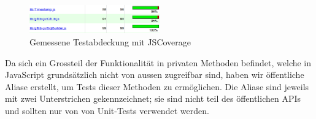 \begin{figure}[!ht]
	\centering
	\includegraphics[width=0.5\textwidth]{images/gftlib-js/gftlibjs-testabdeckung}
	\caption{Gemessene Testabdeckung mit JSCoverage}
	\label{gftlibjs-testabdeckung}
\end{figure}

Da sich ein Grossteil der Funktionalität in privaten Methoden befindet, welche in JavaScript grundsätzlich nicht von aussen zugreifbar sind, haben wir öffentliche Aliase erstellt, um Tests dieser Methoden zu ermöglichen. Die Aliase sind jeweils mit zwei Unterstrichen gekennzeichnet; sie sind nicht teil des öffentlichen \gls{API}s und sollten nur von von Unit-Tests verwendet werden.
